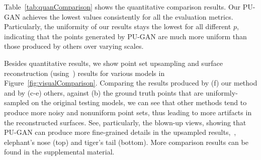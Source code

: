 Table~\ref{tab:quanComparison} shows the quantitative comparison results.
Our PU-GAN achieves the lowest values consistently for all the evaluation metrics.
Particularly, the uniformity of our results stays the lowest for all different $p$, indicating that the points generated by PU-GAN are much more uniform than those produced by others over varying scales.

Besides quantitative results, we show point set upsampling and surface reconstruction (using~\cite{kazhdan2013screened}) results for various models in Figure~\ref{fig:visualComparison}.
Comparing the results produced by (f) our method and by (c-e) others, against (b) the ground truth points that are uniformly-sampled on the original testing models, we can see that other methods tend to produce more noisy and nonuniform point sets, thus leading to more artifacts in the reconstructed surfaces.
See, particularly, the blown-up views, showing that PU-GAN can produce more fine-grained details in the upsampled results,~\eg, elephant's nose (top) and tiger's tail (bottom).
More comparison results can be found in the supplemental material.




